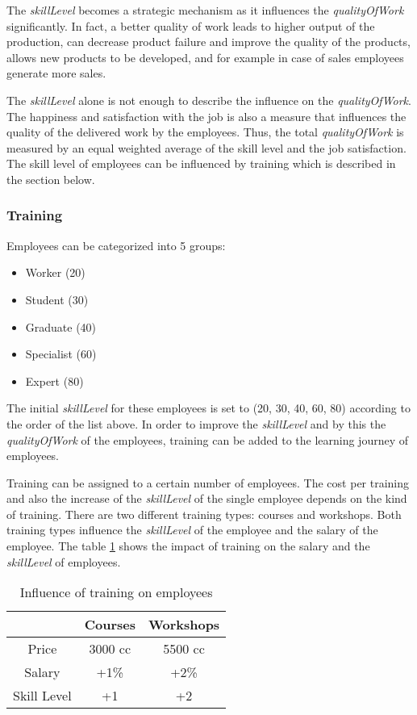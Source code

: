 The \textit{skillLevel} becomes a strategic mechanism as it influences the \textit{qualityOfWork} significantly. In fact, a better quality of work leads to higher output of the production, can decrease product failure and improve the quality of the products, allows new products to be developed, and for example in case of sales employees generate more sales. 

The \textit{skillLevel} alone is not enough to describe the influence on the \textit{qualityOfWork}. The happiness and satisfaction with the job is also a measure that influences the quality of the delivered work by the employees.
Thus, the total \textit{qualityOfWork} is measured by an equal weighted average of the skill level and the job satisfaction. The skill level of employees can be influenced by training which is described in the section below.

\subsubsection{Training}
Employees can be categorized into 5 groups:
\begin{itemize}
    \item Worker (20)
    \item Student (30)
    \item Graduate (40)
    \item Specialist (60)
    \item Expert (80)
\end{itemize}
The initial \textit{skillLevel} for these employees is set to (20, 30, 40, 60, 80) according to the order of the list above. In order to improve the \textit{skillLevel} and by this the \textit{qualityOfWork} of the employees, training can be added to the learning journey of employees. 

Training can be assigned to a certain number of employees. The cost per training and also the increase of the \textit{skillLevel} of the single employee depends on the kind of training. There are two different training types: courses and workshops. Both training types influence the \textit{skillLevel} of the employee and the salary of the employee. The table \ref{tab:trainings_employees} shows the impact of training on the salary and the \textit{skillLevel} of employees.

\begin{table}
    \centering
\begin{tabular}{c|c|c}
    \hline
     & \textbf{Courses} & \textbf{Workshops} \\
     \hline \hline
     Price & 3000 cc & 5500 cc \\
     Salary & +1\% & +2\%  \\
     Skill Level & +1 & +2  \\
     \hline
\end{tabular}
\caption{Influence of training on employees}
    \label{tab:trainings_employees}
\end{table}


